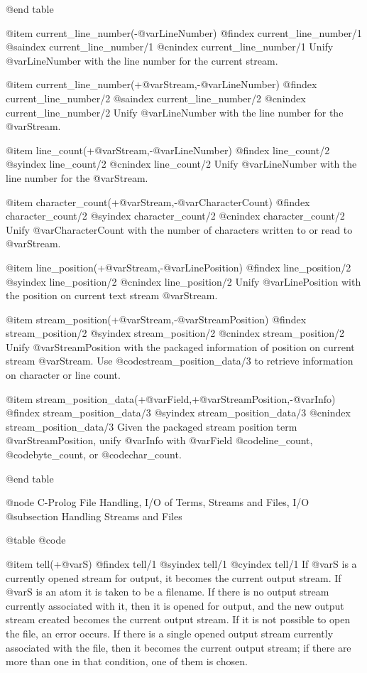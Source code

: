 {{{{{{@end table

@item current_line_number(-@var{LineNumber})
@findex current_line_number/1
@saindex current_line_number/1
@cnindex current_line_number/1
Unify @var{LineNumber} with the line number for the current stream.

@item current_line_number(+@var{Stream},-@var{LineNumber})
@findex current_line_number/2
@saindex current_line_number/2
@cnindex current_line_number/2
Unify @var{LineNumber} with the line number for the @var{Stream}. 

@item line_count(+@var{Stream},-@var{LineNumber})
@findex line_count/2
@syindex line_count/2
@cnindex line_count/2
Unify @var{LineNumber} with the line number for the @var{Stream}.

@item character_count(+@var{Stream},-@var{CharacterCount})
@findex character_count/2
@syindex character_count/2
@cnindex character_count/2
Unify @var{CharacterCount} with the number of characters written to or
read to @var{Stream}.

@item line_position(+@var{Stream},-@var{LinePosition})
@findex line_position/2
@syindex line_position/2
@cnindex line_position/2
Unify @var{LinePosition} with the position on current text stream
@var{Stream}.

@item stream_position(+@var{Stream},-@var{StreamPosition})
@findex stream_position/2
@syindex stream_position/2
@cnindex stream_position/2
Unify @var{StreamPosition} with the packaged information of position on
current stream @var{Stream}. Use @code{stream_position_data/3} to
retrieve information on character or line count.

@item stream_position_data(+@var{Field},+@var{StreamPosition},-@var{Info})
@findex stream_position_data/3
@syindex stream_position_data/3
@cnindex stream_position_data/3
Given the packaged stream position term @var{StreamPosition}, unify
@var{Info} with @var{Field} @code{line_count}, @code{byte_count}, or
@code{char_count}.

@end table

@node C-Prolog File Handling, I/O of Terms, Streams and Files, I/O
@subsection Handling Streams and Files

@table @code

@item tell(+@var{S})
@findex tell/1
@syindex tell/1
@cyindex tell/1
If @var{S} is a currently opened stream for output, it becomes the
current output stream. If @var{S} is an atom it is taken to be a
filename.  If there is no output stream currently associated with it,
then it is opened for output, and the new output stream created becomes
the current output stream. If it is not possible to open the file, an
error occurs.  If there is a single opened output stream currently
associated with the file, then it becomes the current output stream; if
there are more than one in that condition, one of them is chosen.

}}}}}}
